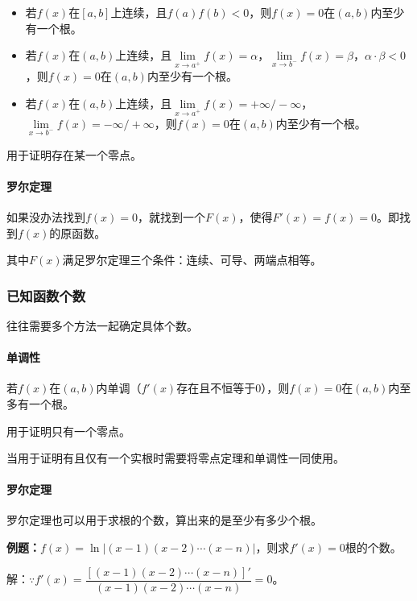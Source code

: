 \documentclass[UTF8, 12pt]{ctexart}
\begin{document}
\begin{itemize}
    \item 若$f(x)$在$[a,b]$上连续，且$f(a)f(b)<0$，则$f(x)=0$在$(a,b)$内至少有一个根。
    \item 若$f(x)$在$(a,b)$上连续，且$\lim\limits_{x\to a^+}f(x)=\alpha$，$\lim\limits_{x\to b^-}f(x)=\beta$，$\alpha\cdot\beta<0$，则$f(x)=0$在$(a,b)$内至少有一个根。
    \item 若$f(x)$在$(a,b)$上连续，且$\lim\limits_{x\to a^+}f(x)=+\infty/-\infty$，$\lim\limits_{x\to b^-}f(x)=-\infty/+\infty$，则$f(x)=0$在$(a,b)$内至少有一个根。
\end{itemize}

用于证明存在某一个零点。

\paragraph{罗尔定理} \leavevmode \medskip

如果没办法找到$f(x)=0$，就找到一个$F(x)$，使得$F'(x)=f(x)=0$。即找到$f(x)$的原函数。

其中$F(x)$满足罗尔定理三个条件：连续、可导、两端点相等。

\subsubsection{已知函数个数}

往往需要多个方法一起确定具体个数。

\paragraph{单调性} \leavevmode \medskip

若$f(x)$在$(a,b)$内单调（$f'(x)$存在且不恒等于0），则$f(x)=0$在$(a,b)$内至多有一个根。

用于证明只有一个零点。

当用于证明有且仅有一个实根时需要将零点定理和单调性一同使用。

\paragraph{罗尔定理} \leavevmode \medskip

罗尔定理也可以用于求根的个数，算出来的是至少有多少个根。

\textbf{例题：}$f(x)=\ln\vert(x-1)(x-2)\cdots(x-n)\vert$，则求$f'(x)=0$根的个数。

解：$\because f'(x)=\dfrac{[(x-1)(x-2)\cdots(x-n)]'}{(x-1)(x-2)\cdots(x-n)}=0$。
\end{document}
